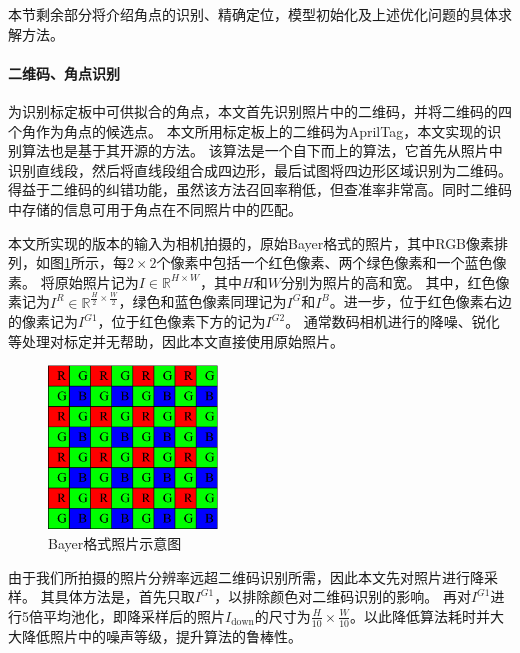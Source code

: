 本节剩余部分将介绍角点的识别、精确定位，模型初始化及上述优化问题的具体求解方法。

\paragraph{二维码、角点识别}为识别标定板中可供拟合的角点，本文首先识别照片中的二维码，并将二维码的四个角作为角点的候选点。
本文所用标定板上的二维码为AprilTag，本文实现的识别算法也是基于其开源的方法\cite{AprilTag}。
该算法是一个自下而上的算法，它首先从照片中识别直线段，然后将直线段组合成四边形，最后试图将四边形区域识别为二维码。得益于二维码的纠错功能，虽然该方法召回率稍低，但查准率非常高。同时二维码中存储的信息可用于角点在不同照片中的匹配。

本文所实现的版本的输入为相机拍摄的，原始Bayer格式的照片，其中RGB像素排列，如图\ref{fig:bayer}所示，每$2\times 2$个像素中包括一个红色像素、两个绿色像素和一个蓝色像素。
将原始照片记为$I\in \mathbb{R}^{H\times W}$，其中$H$和$W$分别为照片的高和宽。
其中，红色像素记为$I^R\in \mathbb{R}^{\frac{H}{2}\times \frac{W}{2}}$，绿色和蓝色像素同理记为$I^G$和$I^B$。进一步，位于红色像素右边的像素记为$I^{G1}$，位于红色像素下方的记为$I^{G2}$。
通常数码相机进行的降噪、锐化等处理对标定并无帮助，因此本文直接使用原始照片。

\begin{figure}
    \centering
    \includegraphics[width=0.4\textwidth]{figures/bayer}
    \caption{Bayer格式照片示意图}
    \label{fig:bayer}
\end{figure}

由于我们所拍摄的照片分辨率远超二维码识别所需，因此本文先对照片进行降采样。
其具体方法是，首先只取$I^{G1}$，以排除颜色对二维码识别的影响。
再对$I^{G1}$进行5倍平均池化，即降采样后的照片$I_{\text{down}}$的尺寸为$\frac{H}{10}\times \frac{W}{10}$。以此降低算法耗时并大大降低照片中的噪声等级，提升算法的鲁棒性。


